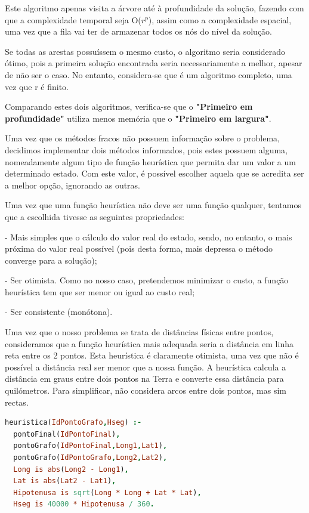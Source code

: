 \documentclass[a4paper]{article}
\begin{document}
Este algoritmo apenas visita a árvore até à profundidade da solução, fazendo com que a complexidade temporal seja O($r ^ p$), assim como a complexidade espacial, uma vez que a fila vai ter de armazenar todos os nós do nível da solução.

Se todas as arestas possuíssem o mesmo custo, o algoritmo seria considerado ótimo, pois a primeira solução encontrada seria necessariamente a melhor, apesar de não ser o caso. No entanto, considera-se que é um algoritmo completo, uma vez que r é finito.

Comparando estes dois algoritmos, verifica-se que o \textbf{"Primeiro em profundidade"} utiliza menos memória que o \textbf{"Primeiro em largura"}.

Uma vez que os métodos fracos não possuem informação sobre o problema, decidimos implementar dois métodos informados, pois estes possuem alguma, nomeadamente algum tipo de função heurística que permita dar um valor a um determinado estado. Com este valor, é possível escolher aquela que se acredita ser a melhor opção, ignorando as outras.

Uma vez que uma função heurística não deve ser uma função qualquer, tentamos que a escolhida tivesse as seguintes propriedades:

- Mais simples que o cálculo do valor real do estado, sendo, no entanto, o mais próxima do valor real possível (pois desta forma, mais depressa o método converge para a solução);

- Ser otimista. Como no nosso caso, pretendemos minimizar o custo, a função heurística tem que ser menor ou igual ao custo real;

- Ser consistente (monótona).

Uma vez que o nosso problema se trata de distâncias físicas entre pontos, consideramos que a função heurística mais adequada seria a distância em linha reta entre os 2 pontos. Esta heurística é claramente otimista, uma vez que não é possível a distância real ser menor que a nossa função. A heurística calcula a distância em graus entre dois pontos na Terra e converte essa distância para quilómetros. Para simplificar, não considera arcos entre dois pontos, mas sim rectas.

\begin{lstlisting}[language=Prolog,xleftmargin=.1\textwidth]
heuristica(IdPontoGrafo,Hseg) :-
  pontoFinal(IdPontoFinal),
  pontoGrafo(IdPontoFinal,Long1,Lat1),
  pontoGrafo(IdPontoGrafo,Long2,Lat2),
  Long is abs(Long2 - Long1),
  Lat is abs(Lat2 - Lat1),
  Hipotenusa is sqrt(Long * Long + Lat * Lat),
  Hseg is 40000 * Hipotenusa / 360.
\end{lstlisting}
\end{document}

